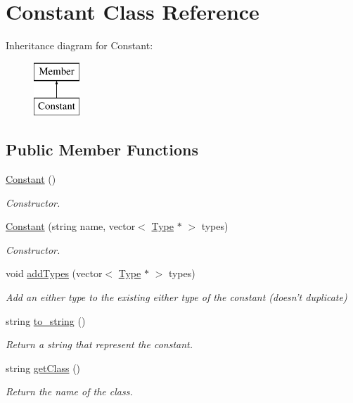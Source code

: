 \hypertarget{classConstant}{\section{Constant Class Reference}
\label{classConstant}
}
Inheritance diagram for Constant\+:\begin{figure}[H]
\begin{center}
\leavevmode
\includegraphics[height=2.000000cm]{classConstant}
\end{center}
\end{figure}
\subsection*{Public Member Functions}
\begin{DoxyCompactItemize}
\item 
\hypertarget{classConstant_a6d2f7d070d22aed4a3371c181da67716}{\hyperlink{classConstant_a6d2f7d070d22aed4a3371c181da67716}{Constant} ()}\label{classConstant_a6d2f7d070d22aed4a3371c181da67716}

\begin{DoxyCompactList}\small\item\em Constructor. \end{DoxyCompactList}\item 
\hyperlink{classConstant_a0d9865c2d8d7f2a81b3048b694806534}{Constant} (string name, vector$<$ \hyperlink{classType}{Type} $\ast$ $>$ types)
\begin{DoxyCompactList}\small\item\em Constructor. \end{DoxyCompactList}\item 
void \hyperlink{classConstant_ac94ccf014f636837cf0be22a227fe1c8}{add\+Types} (vector$<$ \hyperlink{classType}{Type} $\ast$ $>$ types)
\begin{DoxyCompactList}\small\item\em Add an either type to the existing either type of the constant (doesn't duplicate) \end{DoxyCompactList}\item 
string \hyperlink{classConstant_a685a4dbdc864e61c3e14a0fd974ba024}{to\+\_\+string} ()
\begin{DoxyCompactList}\small\item\em Return a string that represent the constant. \end{DoxyCompactList}\item 
string \hyperlink{classConstant_aeb11c90406eb42af86ba8898fb774e1d}{get\+Class} ()
\begin{DoxyCompactList}\small\item\em Return the name of the class. \end{DoxyCompactList}\end{DoxyCompactItemize}
